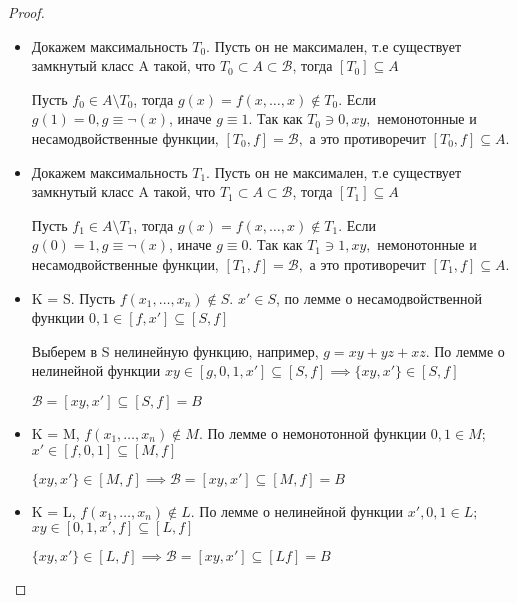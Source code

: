 \documentclass[a4paper]{article}
\theoremstyle{definition}
\theoremstyle{remark}
\begin{document}
    \begin{proof}
        $ $

        \begin{itemize}
            \item Докажем максимальность $T_0$. Пусть он не максимален, т.е существует замкнутый класс A
            такой, что $T_0\subset A \subset \mathcal{B}$, тогда $[T_0]\subseteq A$
    
            Пусть $f_0\in A\setminus T_0$, тогда $g(x) = f(x, \dots, x)\notin T_0$. Если $g(1) = 0, g \equiv \neg(x)$,
            иначе $g\equiv 1$. Так как $T_0\ni 0, xy,$ немонотонные и несамодвойственные функции, $[T_0, f] = \mathcal{B},$
            а это противоречит $[T_0, f]\subseteq A$.
            \item Докажем максимальность $T_1$. Пусть он не максимален, т.е существует замкнутый класс A
            такой, что $T_1\subset A \subset \mathcal{B}$, тогда $[T_1]\subseteq A$
    
            Пусть $f_1\in A\setminus T_1$, тогда $g(x) = f(x, \dots, x)\notin T_1$. Если $g(0) = 1, g \equiv \neg(x)$,
            иначе $g\equiv 0$. Так как $T_1\ni 1, xy,$ немонотонные и несамодвойственные функции, $[T_1, f] = \mathcal{B},$
            а это противоречит $[T_1, f]\subseteq A$.
            \item K = S. Пусть $f(x_1, \dots, x_n) \notin S.$ $x'\in S$, по лемме о несамодвойственной функции
            $0, 1\in [f, x']\subseteq[S, f]$

            Выберем в S нелинейную функцию, например, $g = xy+yz+xz$. По лемме о нелинейной функции
            $xy\in[g, 0, 1, x']\subseteq [S, f]\implies \{xy, x'\}\in [S, f]$

            $\mathcal{B} = [xy, x']\subseteq[S, f]=B$
            \item K = M, $f(x_1, \dots, x_n) \notin M$. По лемме о немонотонной функции
            $0, 1 \in M$; $x' \in [f, 0, 1]\subseteq [M, f]$

            $\{xy, x'\}\in [M, f]\implies \mathcal{B}=[xy, x']\subseteq[M, f] = B$
            \item K = L, $f(x_1, \dots, x_n) \notin L$. По лемме о нелинейной функции
            $x', 0, 1\in L;$ $xy\in  [0, 1, x', f]\subseteq [L, f]$

            $\{xy, x'\}\in [L, f]\implies \mathcal{B}=[xy, x']\subseteq[L f] = B$
        \end{itemize}
        
    \end{proof}
\end{document}
